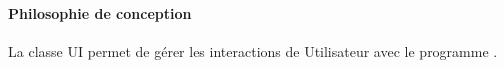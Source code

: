  \paragraph{Philosophie de conception}
La classe UI permet de gérer les interactions de Utilisateur avec le programme {\nomLogiciel}.\\